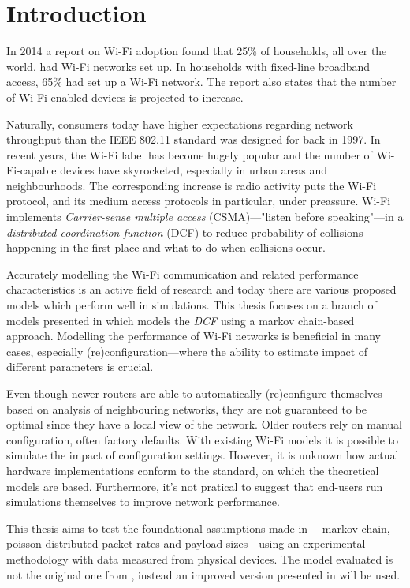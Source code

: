 
\chapter{Introduction}

In 2014 a report on Wi-Fi adoption found that 25\% of households, all over the
world, had Wi-Fi networks set up. In households with fixed-line broadband
access, 65\% had set up a Wi-Fi network\cite{smith}. The report also states that
the number of Wi-Fi-enabled devices is projected to increase.

Naturally, consumers today have higher expectations regarding network
throughput than the IEEE 802.11 standard was designed for back in 1997. In
recent years, the Wi-Fi label has become hugely popular and the number of
Wi-Fi-capable devices have skyrocketed, especially in urban areas and
neighbourhoods. The corresponding increase is radio activity puts the Wi-Fi
protocol, and its medium access protocols in particular, under preassure.
Wi-Fi implements \emph{Carrier-sense multiple access} (CSMA)—"listen before
speaking"—in a \emph{distributed coordination function} (DCF) to reduce
probability of collisions happening in the first place and what to do when
collisions occur. 

Accurately modelling the Wi-Fi communication and related performance
characteristics is an active field of research and today there are various
proposed models which perform well in simulations. This thesis focuses on a
branch of models presented in \cite{bianchi} which models the \emph{DCF} using
a markov chain-based approach. Modelling the performance of Wi-Fi networks is
beneficial in many cases, especially (re)configuration—where the ability to
estimate impact of different parameters is crucial. 

Even though newer routers are able to automatically (re)configure themselves
based on analysis of neighbouring networks, they are not guaranteed to be
optimal since they have a local view of the network. Older routers rely on
manual configuration, often factory defaults. With existing Wi-Fi models it is
possible to simulate the impact of configuration settings. However, it is
unknown how actual hardware implementations conform to the standard, on which
the theoretical models are based. Furthermore, it's not pratical to suggest
that end-users run simulations themselves to improve network performance.

This thesis aims to test the foundational assumptions made in
\cite{bianchi}—markov chain, poisson-distributed packet rates and payload
sizes—using an experimental methodology with data measured from physical
devices. The model evaluated is not the original one from \cite{bianchi},
instead an improved version presented in \cite{felemban} will be used.

